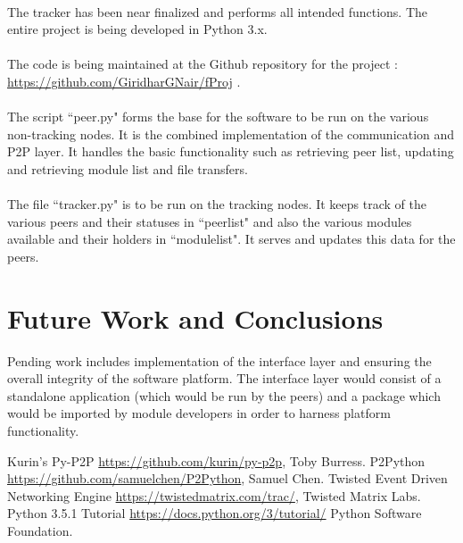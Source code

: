 \documentclass[a4paper,11pt,twocolumn]{article}
\begin{document}
\paragraph{}
The tracker has been near finalized and performs all intended functions. The entire project is being developed in Python 3.x. 
\paragraph{}
The code is being maintained at the Github repository for the project : \url{https://github.com/GiridharGNair/fProj} . 
\paragraph{}
The script ``peer.py" forms the base for the software to be run on the various non-tracking nodes. It is the combined implementation of the communication and P2P layer. It handles the basic functionality such as retrieving peer list, updating and retrieving module list and file transfers.
\paragraph{}
The file ``tracker.py" is to be run on the tracking nodes. It keeps track of the various peers and their statuses in ``peerlist" and also the various modules available and their holders in ``modulelist". It serves and updates this data for the peers.
\section{Future Work and Conclusions}
Pending work includes implementation of the interface layer and ensuring the overall integrity of the software platform. The interface layer would consist of a standalone application (which would be run by the peers) and a package which would be imported by module developers in order to harness platform functionality.

\begin{thebibliography}{}
Kurin's Py-P2P \url{https://github.com/kurin/py-p2p}, Toby Burress.
P2Python \url{https://github.com/samuelchen/P2Python}, Samuel Chen.
Twisted Event Driven Networking Engine \url{https://twistedmatrix.com/trac/}, Twisted Matrix Labs.
Python 3.5.1 Tutorial \url{https://docs.python.org/3/tutorial/} Python Software Foundation.
\end{thebibliography}{}
\end{document}
